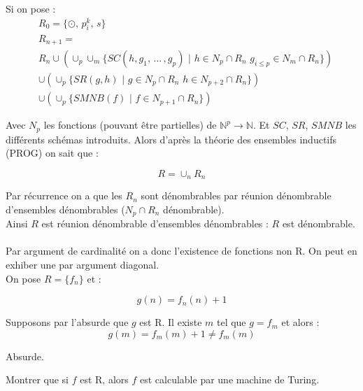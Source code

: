 \documentclass[12pt,letterpaper,boxed]{hmcpset}
\begin{document}
\begin{solution}
Si on pose : 
\begin{align*}
& R_{0}  = \{ \odot, \, p^{k}_{i}, \, s \} \\
& R_{n+1}  = \\ 
& R_{n} \cup ( \cup_{p} \cup_{m} \{ SC(h,g_{1}, \, \dots \, , g_{p}) \, \, | \, \, h \in  N_{p} \cap R_{n} \, \, g_{i \leq p} \in N_{m} \cap R_{n}  \} ) \\ 
& \cup (\cup_{p} \{ SR(g,h) \, \, | \, \, g \in N_{p} \cap R_{n} \, \, h \in N_{p+2} \cap R_{n} \}) \\
& \cup (\cup_{p} \{ SMNB(f) \, \, | \, \, f \in N_{p+1} \cap R_{n} \})
 \end{align*}
 
 \newpage
 
 Avec $N_{p}$ les fonctions (pouvant être partielles) de $\mathbb{N}^{p} \to \mathbb{N}$. Et $SC$, $SR$, $SMNB$ les différents schémas introduits. Alors d'après la théorie des ensembles inductifs (PROG) on sait que :
 
 $$ R = \cup_{n} R_{n} $$

\noindent Par récurrence on a que les $R_{n}$ sont dénombrables par réunion dénombrable d'ensembles dénombrables ($N_{p}\cap R_{n}$ dénombrable). \\
Ainsi $R$ est réunion dénombrable d'ensembles dénombrables : $R$ est dénombrable. \\
\\
Par argument de cardinalité on a donc l'existence de fonctions non R. On peut en exhiber une par argument diagonal. \\
On pose $R = \{ f_{n} \}$ et : 

$$ g(n) = f_{n}(n) + 1$$

\noindent Supposons par l'absurde que $g$ est R. Il existe $m$ tel que $g = f_m$ et alors : 
$$ g(m) = f_{m}(m) + 1 \neq f_{m}(m)$$

\noindent Absurde.

\end{solution}

\begin{problem}[Question 5]
Montrer que si $f$ est R, alors $f$ est calculable par une machine de Turing.
\end{problem}
\end{document}
